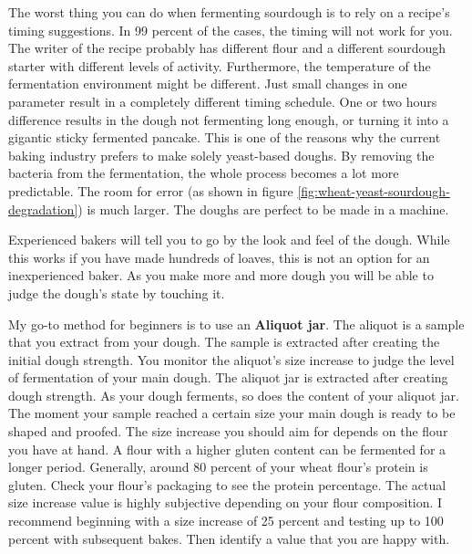 The worst thing you can do when fermenting sourdough
is to rely on a recipe's timing suggestions. In 99 percent
of the cases, the timing will not work for you. The writer
of the recipe probably has different flour and a different
sourdough starter with different levels of activity. Furthermore,
the temperature of the fermentation environment might be
different. Just small changes in one parameter result
in a completely different timing schedule. One or two hours
difference results in the dough not fermenting long enough, or
turning it into a gigantic sticky fermented pancake. This
is one of the reasons why the current baking industry prefers
to make solely yeast-based doughs. By removing the bacteria
from the fermentation, the whole process becomes a lot more
predictable. The room for error (as shown in figure \ref{fig:wheat-yeast-sourdough-degradation})
is much larger. The doughs are perfect to be made in a
machine.

Experienced bakers will tell you to go by the look and feel of
the dough. While this works if you have made hundreds of loaves,
this is not an option for an inexperienced baker. As
you make more and more dough you will be able to judge
the dough's state by touching it.

My go-to method for beginners is to use an \textbf{Aliquot jar}.
The aliquot is a sample that you extract from your dough. The
sample is extracted after creating the initial dough strength.
You monitor the aliquot's size increase to judge the
level of fermentation of your main dough. The aliquot
jar is extracted after creating dough strength. As your
dough ferments, so does the content of your aliquot jar. The moment your
sample reached a certain size your main dough is ready
to be shaped and proofed. The size increase you should
aim for depends on the flour you have at hand. A flour
with a higher gluten content can be fermented for a
longer period. Generally, around 80 percent
of your wheat flour's protein is gluten. Check your flour's
packaging to see the protein percentage. The actual size increase
value is highly subjective depending on your flour composition.
I recommend beginning with a size increase of 25 percent and testing
up to 100 percent with subsequent bakes. Then identify a value
that you are happy with.

